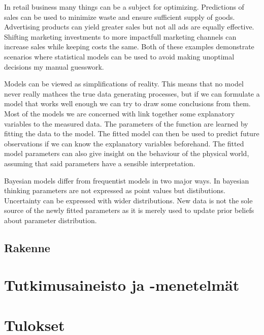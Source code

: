 \documentclass[english, 12pt, a4paper, sci, utf8, a-1b, online]{aaltothesis}
\begin{document}
In retail business many things can be a subject for optimizing. Predictions of sales can be used
to minimize waste and ensure sufficient supply of goods. Advertising products can yield greater sales
but not all ads are equally effective. Shifting marketing investments to more impactfull marketing channels
can increase sales while keeping costs the same. Both of these examples demonstrate scenarios where statistical models can be used to
avoid making unoptimal decisions my manual guesswork.

Models can be viewed as simplifications of reality. This means that no model never really mathces the true data generating processes, 
but if we can formulate a model that works well enough we can try to draw some conclusions from them. Most of the models we are concerned with
link together some explanatory variables to the measured data. The parameters of the function are learned by fitting the data to the model.
The fitted model can then be used to predict future observations if we can know the explanatory variables beforehand. The fitted model parameters
can also give insight on the behaviour of the physical world, assuming that said parameters have a sensible interpretation.

Bayesian models differ from frequentist models in two major ways. In bayesian thinking parameters are not expressed as point values but distibutions.
Uncertainty can be expressed with wider distributions. New data is not the sole source of the newly fitted parameters as it is merely used to
update prior beliefs about parameter distribution. 






\subsection{Rakenne}

\section{Tutkimusaineisto ja -menetelmät}



\section{Tulokset}
\end{document}
